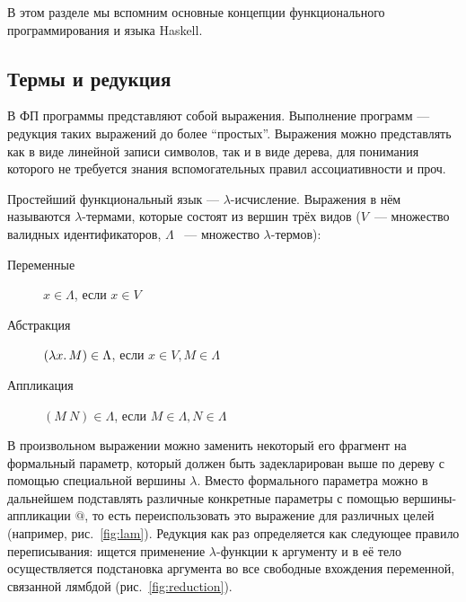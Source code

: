 В этом разделе мы вспомним основные концепции функционального программирования и языка Haskell.

\subsection{Термы и редукция} \label{subsec:terms-reduction}

В ФП программы представляют собой выражения.
Выполнение программ --- редукция таких выражений до более ``простых''.
Выражения можно представлять как в виде линейной записи символов, так и в виде дерева, для понимания которого не требуется знания вспомогательных правил ассоциативности и проч.

Простейший функциональный язык --- $\lambda$-исчисление.
Выражения в нём называются $\lambda$-термами, которые состоят из вершин трёх видов ($V$~--- множество валидных идентификаторов, $\Lambda$ ~--- множество $\lambda$-термов):
\begin{description}
    \item[Переменные] $x \in \Lambda$, если $x \in V$ \hspace{2em}
    \item[Абстракция] $(\lambda x\ldotp M) \in \Lambda$, если $x \in V, M \in \Lambda$ \hspace{2em}
    \item[Аппликация] $(M~N) \in \Lambda$, если $M \in \Lambda, N \in \Lambda$ \hspace{2em}
\end{description}

В произвольном выражении можно заменить некоторый его фрагмент на формальный параметр, который должен быть задекларирован выше по дереву с помощью специальной вершины $\lambda$.
Вместо формального параметра можно в дальнейшем подставлять различные конкретные параметры с помощью вершины-аппликации $@$, то есть переиспользовать это выражение для различных целей (например, рис.\ \ref{fig:lam}).
Редукция как раз определяется как следующее правило переписывания: ищется применение $\lambda$-функции к аргументу и в её тело осуществляется подстановка аргумента во все свободные вхождения переменной, связанной лямбдой (рис.\ \ref{fig:reduction}).

